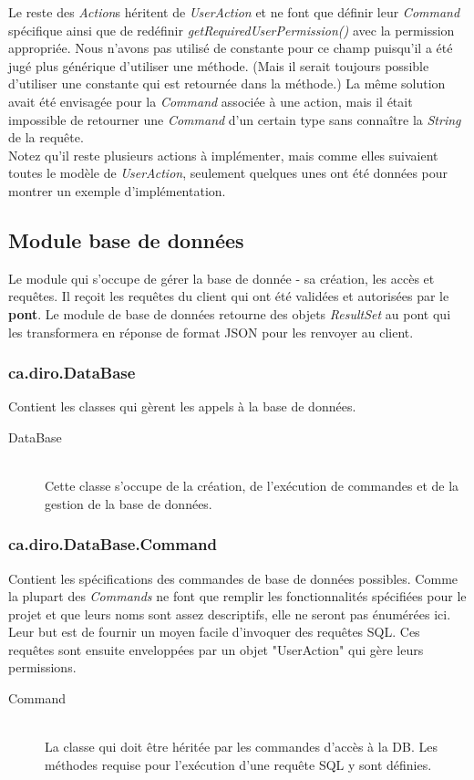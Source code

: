 \documentclass[10pt,a4paper]{report}
\begin{document}
\begin{flushleft}
\begin{description}
\end{description}
\bigskip
Le reste des \emph{Action}s héritent de \emph{UserAction} et ne font que définir leur \emph{Command} spécifique ainsi que de redéfinir \emph{getRequiredUserPermission()} avec la permission appropriée. Nous n'avons pas utilisé de constante pour ce champ puisqu'il a été jugé plus générique d'utiliser une méthode. (Mais il serait toujours possible d'utiliser une constante qui est retournée dans la méthode.) La même solution avait été envisagée pour la \emph{Command} associée à une action, mais il était impossible de retourner une \emph{Command} d'un certain type sans connaître la \emph{String} de la requête.\\
\medskip
Notez qu'il reste plusieurs actions à implémenter, mais comme elles suivaient toutes le modèle de \emph{UserAction}, seulement quelques unes ont été données pour montrer un exemple d'implémentation.\\
\bigskip
\subsection*{Module base de données}
Le module qui s'occupe de gérer la base de donnée - sa création, les accès et requêtes. Il reçoit les requêtes du client qui ont été validées et autorisées par le \textbf{pont}. Le module de base de données retourne des objets \emph{ResultSet} au pont qui les transformera en réponse de format JSON pour les renvoyer au client.\\
\bigskip
\subsubsection*{ca.diro.DataBase}
Contient les classes qui gèrent les appels à la base de données.\\
\begin{description}
\item[DataBase] \hfill \\ Cette classe s'occupe de la création, de l'exécution de commandes et de la gestion de la base de données.
\end{description}
\bigskip
\subsubsection*{ca.diro.DataBase.Command}
Contient les spécifications des commandes de base de données possibles. Comme la plupart des \emph{Commands} ne font que remplir les fonctionnalités spécifiées pour le projet et que leurs noms sont assez descriptifs, elle ne seront pas énumérées ici. Leur but est de fournir un moyen facile d'invoquer des requêtes SQL. Ces requêtes sont ensuite enveloppées par un objet "UserAction" qui gère leurs permissions.\\
\begin{description}
\item[Command] \hfill \\ La classe qui doit être héritée par les commandes d'accès à la DB. Les méthodes requise pour l'exécution d'une requête SQL y sont définies.
\end{description}
\bigskip

\end{flushleft}
\end{document}
